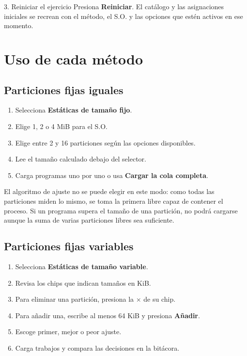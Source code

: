 \documentclass[11pt,a4paper]{article}
\newcommand{\control}[1]{\textsf{\textbf{#1}}}
\begin{document}
\begin{paso}{3. Reiniciar el ejercicio}
Presiona \control{Reiniciar}. El catálogo y las asignaciones iniciales se recrean
con el método, el S.O. y las opciones que estén activos en ese momento.
\end{paso}

\section{Uso de cada método}

\subsection{Particiones fijas iguales}

\begin{enumerate}
  \item Selecciona \control{Estáticas de tamaño fijo}.
  \item Elige 1, 2 o 4 MiB para el S.O.
  \item Elige entre 2 y 16 particiones según las opciones disponibles.
  \item Lee el tamaño calculado debajo del selector.
  \item Carga programas uno por uno o usa \control{Cargar la cola completa}.
\end{enumerate}

El algoritmo de ajuste no se puede elegir en este modo: como todas las particiones
miden lo mismo, se toma la primera libre capaz de contener el proceso. Si un
programa supera el tamaño de una partición, no podrá cargarse aunque la suma de
varias particiones libres sea suficiente.

\subsection{Particiones fijas variables}

\begin{enumerate}
  \item Selecciona \control{Estáticas de tamaño variable}.
  \item Revisa los chips que indican tamaños en KiB.
  \item Para eliminar una partición, presiona la \(\times\) de su chip.
  \item Para añadir una, escribe al menos 64 KiB y presiona \control{Añadir}.
  \item Escoge primer, mejor o peor ajuste.
  \item Carga trabajos y compara las decisiones en la bitácora.
\end{enumerate}
\end{document}
